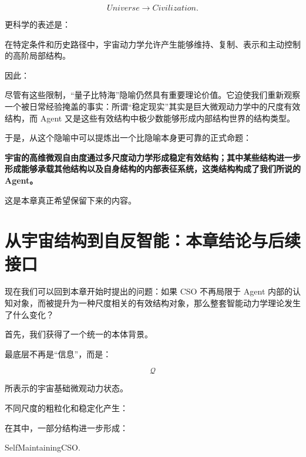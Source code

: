 \[
Universe
\rightarrow
Civilization.
\]

更科学的表述是：

\begin{statementbox}
在特定条件和历史路径中，宇宙动力学允许产生能够维持、复制、表示和主动控制的高阶局部结构。
\end{statementbox}

因此：

\begin{statementbox}
\centering
{}
\end{statementbox}

尽管有这些限制，“量子比特海”隐喻仍然具有重要理论价值。它迫使我们重新观察一个被日常经验掩盖的事实：所谓“稳定现实”其实是巨大微观动力学中的尺度有效结构，而 Agent 又是这些有效结构中极少数能够形成内部结构世界的结构类型。

于是，从这个隐喻中可以提炼出一个比隐喻本身更可靠的正式命题：

\begin{proposition*}
\bfseries
宇宙的高维微观自由度通过多尺度动力学形成稳定有效结构；其中某些结构进一步形成能够承载其他结构以及自身结构的内部表征系统，这类结构构成了我们所说的 Agent。
\end{proposition*}

这是本章真正希望保留下来的内容。

\section{从宇宙结构到自反智能：本章结论与后续接口}

现在我们可以回到本章开始时提出的问题：如果 CSO 不再局限于 Agent 内部的认知对象，而被提升为一种尺度相关的有效结构对象，那么整套智能动力学理论发生了什么变化？

首先，我们获得了一个统一的本体背景。

最底层不再是“信息”，而是：

\[
\boxed{
\mathcal Q
}
\]

所表示的宇宙基础微观动力状态。

不同尺度的粗粒化和稳定化产生：

\begin{statementbox}
\centering
{}
\end{statementbox}

在其中，一部分结构进一步形成：

\begin{statementbox}
SelfMaintainingCSO.
\end{statementbox}

